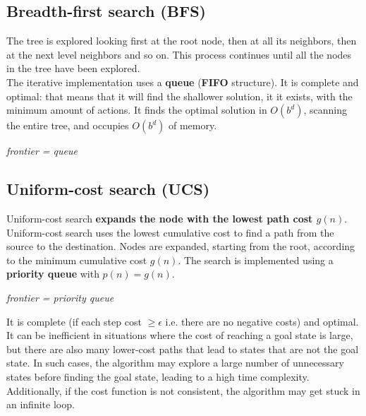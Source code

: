 \documentclass{article}
\begin{document}
\newpage

\subsection{Breadth-first search (BFS)}

The tree is explored looking first at the root node, then at all its neighbors, then at the next level neighbors and so on. This process continues until all the nodes in the tree have been explored. \\

The iterative implementation uses a \textbf{queue} (\textbf{FIFO} structure). It is complete and optimal: that means that it will find the shallower solution, it it exists, with the minimum amount of actions. It finds the optimal solution in $O(b^d)$, scanning the entire tree, and occupies $O(b^d)$ of memory.

\begin{center}
    \textit{frontier = queue}
\end{center}

\newpage

\subsection{Uniform-cost search (UCS)}

Uniform-cost search \textbf{expands the node with the lowest path cost $g(n)$}. \\

Uniform-cost search uses the lowest cumulative cost to find a path from the source to the destination. Nodes are expanded, starting from the root, according to the minimum cumulative cost $g(n)$. The search is implemented using a \textbf{priority queue} with $p(n) = g(n)$.

\begin{center}
    \textit{frontier = priority queue}
\end{center}

It is complete (if each step cost $\geq \epsilon$ i.e. there are no negative costs) and optimal. It can be inefficient in situations where the cost of reaching a goal state is large, but there are also many lower-cost paths that lead to states that are not the goal state. In such cases, the algorithm may explore a large number of unnecessary states before finding the goal state, leading to a high time complexity. Additionally, if the cost function is not consistent, the algorithm may get stuck in an infinite loop. \\
\end{document}
